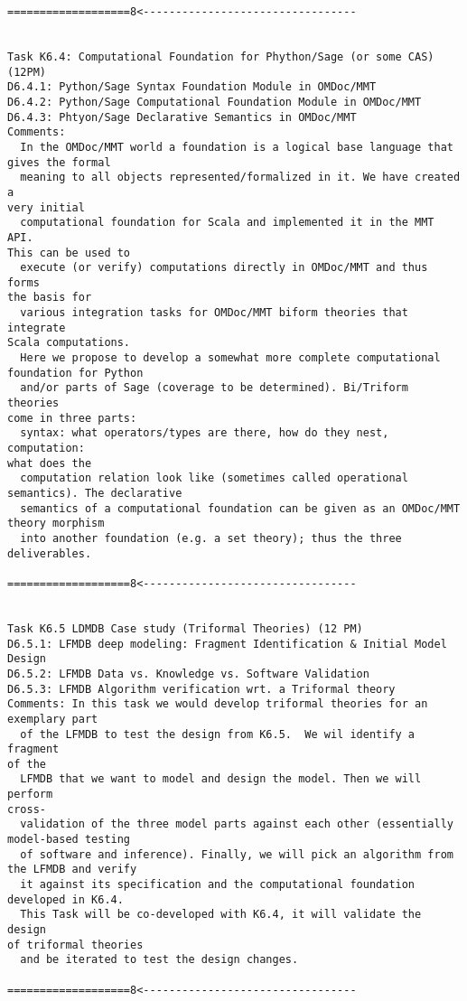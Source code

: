 \begin{Workpackage}{\thewpno}
\begin{verbatim}
===================8<---------------------------------


Task K6.4: Computational Foundation for Phython/Sage (or some CAS) (12PM)
D6.4.1: Python/Sage Syntax Foundation Module in OMDoc/MMT
D6.4.2: Python/Sage Computational Foundation Module in OMDoc/MMT
D6.4.3: Phtyon/Sage Declarative Semantics in OMDoc/MMT
Comments:
  In the OMDoc/MMT world a foundation is a logical base language that
gives the formal
  meaning to all objects represented/formalized in it. We have created a
very initial
  computational foundation for Scala and implemented it in the MMT API.
This can be used to
  execute (or verify) computations directly in OMDoc/MMT and thus forms
the basis for
  various integration tasks for OMDoc/MMT biform theories that integrate
Scala computations.
  Here we propose to develop a somewhat more complete computational
foundation for Python
  and/or parts of Sage (coverage to be determined). Bi/Triform theories
come in three parts:
  syntax: what operators/types are there, how do they nest, computation:
what does the
  computation relation look like (sometimes called operational
semantics). The declarative
  semantics of a computational foundation can be given as an OMDoc/MMT
theory morphism
  into another foundation (e.g. a set theory); thus the three deliverables.

===================8<---------------------------------


Task K6.5 LDMDB Case study (Triformal Theories) (12 PM)
D6.5.1: LFMDB deep modeling: Fragment Identification & Initial Model Design
D6.5.2: LFMDB Data vs. Knowledge vs. Software Validation
D6.5.3: LFMDB Algorithm verification wrt. a Triformal theory
Comments: In this task we would develop triformal theories for an
exemplary part
  of the LFMDB to test the design from K6.5.  We wil identify a fragment
of the
  LFMDB that we want to model and design the model. Then we will perform
cross-
  validation of the three model parts against each other (essentially
model-based testing
  of software and inference). Finally, we will pick an algorithm from
the LFMDB and verify
  it against its specification and the computational foundation
developed in K6.4.
  This Task will be co-developed with K6.4, it will validate the design
of triformal theories
  and be iterated to test the design changes.

===================8<---------------------------------



\end{verbatim}
\end{Workpackage}

